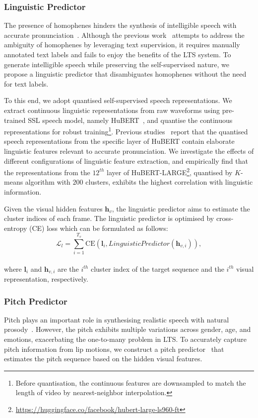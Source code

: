 \documentclass[letterpaper]{article} %
\begin{document}
\subsubsection{Linguistic Predictor}
The presence of homophenes hinders the synthesis of intelligible speech with accurate pronunciation~\cite{ephrat2017vid2speech}.
Although the previous work~\cite{kim2023lip} attempts to address the ambiguity of homophenes by leveraging text supervision, it requires manually annotated text labels and fails to enjoy the benefits of the LTS system.
To generate intelligible speech while preserving the self-supervised nature, we propose a linguistic predictor that disambiguates homophenes without the need for text labels.

To this end, we adopt quantised self-supervised speech representations.
We extract continuous linguistic representations from raw waveforms using pre-trained SSL speech model, namely HuBERT~\cite{hsu2021hubert}, and quantise the continuous representations for robust training\footnote{Before quantisation, the continuous features are downsampled to match the length of video by nearest-neighbor interpolation.}.
Previous studies~\cite{polyak2021speech, lakhotia2021generative, kreuk2021textless} report that the quantised speech representations from the specific layer of HuBERT contain elaborate linguistic features relevant to accurate pronunciation.
We investigate the effects of different configurations of linguistic feature extraction, and empirically find that the representations from the $12^{th}$ layer of HuBERT-LARGE\footnote{\url{https://huggingface.co/facebook/hubert-large-ls960-ft}}, quantised by $K$-means algorithm with $200$ clusters, exhibits the highest correlation with linguistic information.

Given the visual hidden features $\boldsymbol{h}_v$, the linguistic predictor aims to estimate the cluster indices of each frame.
The linguistic predictor is optimised by cross-entropy (CE) loss which can be formulated as follows:
\begin{equation}
\mathcal{L}_{l}=\sum_{i=1}^{T_v}\text{CE}(\boldsymbol{l}_{i}, LinguisticPredictor(\boldsymbol{h}_{v,i})),
\end{equation}\\
where $\boldsymbol{l}_{i}$ and $\boldsymbol{h}_{v,i}$ are the $i^{th}$ cluster index of the target sequence and the $i^{th}$ visual representation, respectively.

\subsubsection{Pitch Predictor}
Pitch plays an important role in synthesising realistic speech with natural prosody~\cite{yasuda2019investigation,lancucki2021fastpitch}. However, the pitch exhibits multiple variations across gender, age, and emotions, exacerbating the one-to-many problem in LTS.
To accurately capture pitch information from lip motions, we construct a pitch predictor~\cite{lancucki2021fastpitch} that estimates the pitch sequence based on the hidden visual features.
\end{document}
